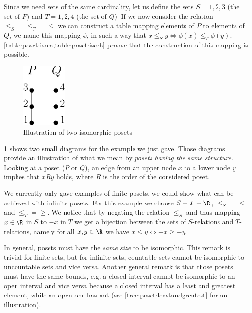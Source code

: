 Since we need sets of the same cardinality, let us define the sets $S = {1, 2,
3}$ (the set of $P$) and $T = {1, 2, 4}$ (the set of $Q$). If we now consider
the relation $\le_S = \le_T = \le$ we can construct a table mapping elements of
$P$ to elements of $Q$, we name this mapping $\phi$, in such a way that $x
\le_S y \iff \phi(x) \le_T \phi(y)$. \cref{table:poset:iso:a,table:poset:iso:b}
proove that the construction of this mapping is possible.

\begin{figure}
	\centering
	\includegraphics[width=0.2\textwidth]{fig/poset/iso/a}
	\caption{Illustration of two isomorphic posets}
	\label{fig:poset:iso:a}
\end{figure}

\ref{fig:poset:iso:a} shows two small diagrams for the example we just gave.
Those diagrams provide an illustration of what we mean by \emph{posets having
the same structure}. Looking at a poset ($P$ or $Q$), an edge from an upper
node $x$ to a lower node $y$ implies that $x R y$ holds, where $R$ is the order
of the considered poset.


We currently only gave examples of finite posets, we could show what can be
achieved with infinite posets. For this example we choose $S = T = \R$,
$\le_S = \le$ and $\le_T = \ge$. We notice that by negating the relation
$\le_S$ and thus mapping $x \in \R$ in $S$ to $-x$ in $T$ we get a
bijection between the sets of $S$-relations and $T$-relations, namely for all
$x, y \in \R$ we have $x \le y \iff -x \ge -y$.

In general, posets must have the \emph{same size} to be isomorphic. This remark
is trivial for finite sets, but for infinite sets, countable sets cannot be
isomorphic to uncountable sets and vice versa. Another general remark is that
those posets must have the same bounds, e.g. a closed interval cannot be
isomorphic to an open interval and vice versa because a closed interval has a
least and greatest element, while an open one has not (see
\ref{tree:poset:leastandgreatest} for an illustration).

